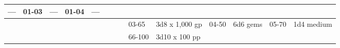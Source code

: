 \begin{longtable}{llllllllllllll}
{\begin{minipage}[t]{0.469in}
---\end{minipage}} & \multicolumn{1}{p{0.923in}|}{\begin{minipage}[t]{0.923in}\raggedright
01-03\end{minipage}} & \multicolumn{1}{p{0.469in}|}{\begin{minipage}[t]{0.469in}\raggedright
---\end{minipage}} & \multicolumn{1}{p{0.626in}|}{\begin{minipage}[t]{0.626in}\raggedright
01-04\end{minipage}} & \multicolumn{1}{p{0.469in}|}{\begin{minipage}[t]{0.469in}\centering
---\end{minipage}}\\
\hline
\multicolumn{8}{p{1.150in}|}{\begin{minipage}[t]{1.150in}\centering
\end{minipage}} & \multicolumn{1}{|p{0.393in}|}{\begin{minipage}[t]{0.393in}\raggedright
03-65\end{minipage}} & \multicolumn{1}{p{0.469in}|}{\begin{minipage}[t]{0.469in}\raggedright
3d8 x 1,000 gp\end{minipage}} & \multicolumn{1}{p{0.923in}|}{\begin{minipage}[t]{0.923in}\raggedright
04-50\end{minipage}} & \multicolumn{1}{p{0.469in}|}{\begin{minipage}[t]{0.469in}\raggedright
6d6 gems\end{minipage}} & \multicolumn{1}{p{0.626in}|}{\begin{minipage}[t]{0.626in}\raggedright
05-70\end{minipage}} & \multicolumn{1}{p{0.469in}|}{\begin{minipage}[t]{0.469in}\centering
1d4 medium\end{minipage}}\\
\hline
\multicolumn{8}{p{1.150in}|}{\begin{minipage}[t]{1.150in}\centering
\end{minipage}} & \multicolumn{1}{|p{0.393in}|}{\begin{minipage}[t]{0.393in}\raggedright
66-100\end{minipage}} & \multicolumn{1}{p{0.469in}|}{\begin{minipage}[t]{0.469in}\raggedright
3d10 x 100 pp\end{minipage}} & \multicolumn{1}{p{0.923in}|}{\begin{minipage}[t]{0.923in}\raggedright

\end{minipage}}
\end{longtable}
